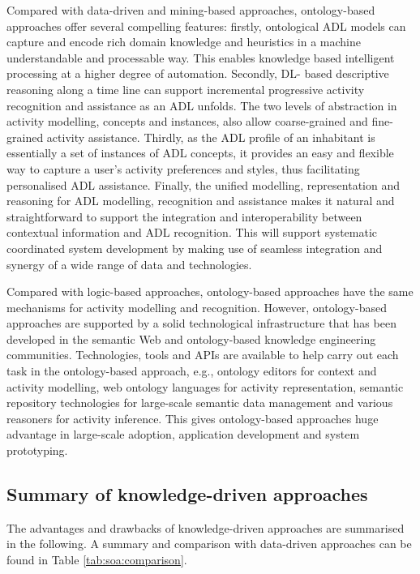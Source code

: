 Compared with data-driven and mining-based approaches, ontology-based approaches offer several compelling features: firstly, ontological ADL models can capture and encode rich domain knowledge and heuristics in a machine understandable and processable way. This enables knowledge based intelligent processing at a higher degree of automation. Secondly, DL- based descriptive reasoning along a time line can support incremental progressive activity recognition and assistance as an ADL unfolds. The two levels of abstraction in activity modelling, concepts and instances, also allow coarse-grained and fine-grained activity assistance. Thirdly, as the ADL profile of an inhabitant is essentially a set of instances of ADL concepts, it provides an easy and flexible way to capture a user’s activity preferences and styles, thus facilitating personalised ADL assistance. Finally, the unified modelling, representation and reasoning for ADL modelling, recognition and assistance makes it natural and straightforward to support the integration and interoperability between contextual information and ADL recognition. This will support systematic coordinated system development by making use of seamless integration and synergy of a wide range of data and technologies. 

Compared with logic-based approaches, ontology-based approaches have the same mechanisms for activity modelling and recognition. However, ontology-based approaches are supported by a solid technological infrastructure that has been developed in the semantic Web and ontology-based knowledge engineering communities. Technologies, tools and APIs are available to help carry out each task in the ontology-based approach, e.g., ontology editors for context and activity modelling, web ontology languages for activity representation, semantic repository technologies for large-scale semantic data management and various reasoners for activity inference. This gives ontology-based approaches huge advantage in large-scale adoption, application development and system prototyping.

\subsection{Summary of knowledge-driven approaches}
The advantages and drawbacks of knowledge-driven approaches are summarised in the following. A summary and comparison with data-driven approaches can be found in Table \ref{tab:soa:comparison}.

